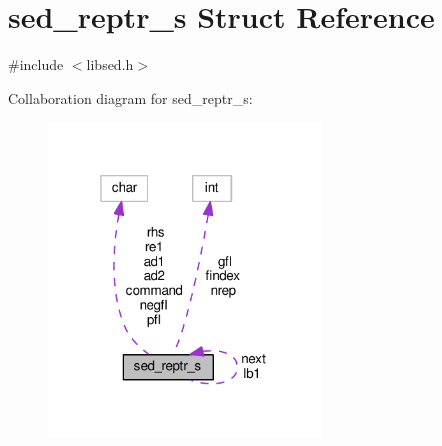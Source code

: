 \hypertarget{structsed__reptr__s}{}\section{sed\+\_\+reptr\+\_\+s Struct Reference}
\label{structsed__reptr__s}


{\ttfamily \#include $<$libsed.\+h$>$}



Collaboration diagram for sed\+\_\+reptr\+\_\+s\+:
\nopagebreak
\begin{figure}[H]
\begin{center}
\leavevmode
\includegraphics[width=205pt]{structsed__reptr__s__coll__graph}
\end{center}
\end{figure}
